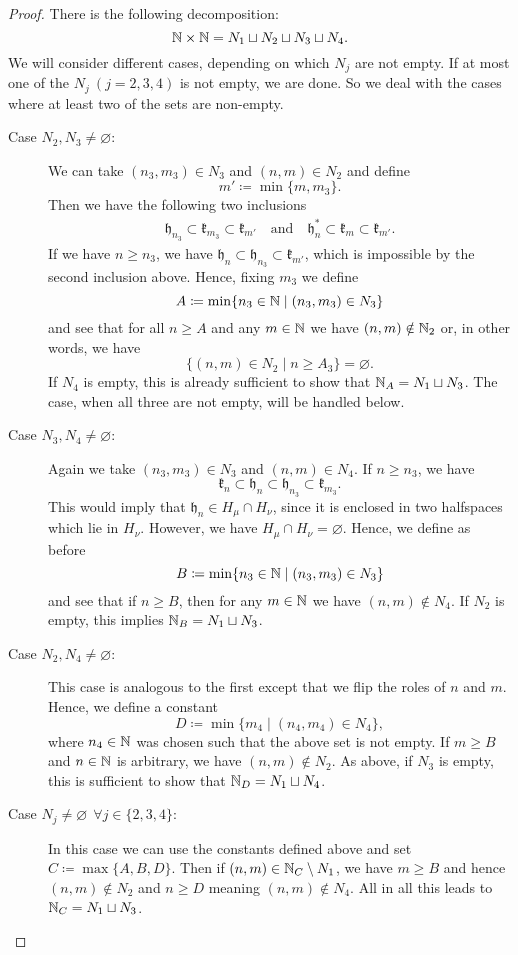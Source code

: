 \begin{proof}
  There is the following decomposition:
  \[
    \mathbb{N} \times \mathbb{N} = N_1 \sqcup N_2 \sqcup N_3 \sqcup N_4.
  \] 
  We will consider different cases, depending on which \(N_j\) are not empty. If at most one of the \(N_j\ (j = 2,3,4)\)  is not empty, we are done. So we deal with the cases where at least two of the sets are non-empty.
  \begin{description}
  \item[Case \(N_2, N_3 \neq \varnothing\):] We can take \((n_3, m_3) \in N_3\) and \((n,m) \in N_2\) and define
    \[
      m' \coloneqq \min\{m, m_3\}.
    \]
    Then we have the following two inclusions
    \begin{align*}
      \mathfrak{h}_{n_3} \subset \mathfrak{k}_{m_3} \subset \mathfrak{k}_{m'} \quad \text{and}\quad \mathfrak{h}_{n}^\ast \subset \mathfrak{k}_m \subset \mathfrak{k}_{m'}.
    \end{align*}
    If we have \(n \geq n_3\), we have \(\mathfrak{h}_n \subset \mathfrak{h}_{n_3} \subset \mathfrak{k}_{m'}\), which is impossible by the second inclusion above. Hence, fixing \(m_3\) we define
    \[
      A \coloneqq \min \{n_3 \in \mathbb{N} \mid (n_3, m_3) \in N_3\}
    \]
    and see that for all \(n \geq A\) and any \(m \in \mathbb{N}\) we have \((n,m) \notin \mathbb{N}_2\) or, in other words, we have
    \[
      \{(n,m) \in N_2 \mid n \geq A_3\} = \varnothing.
    \]
    If \(N_4\) is empty, this is already sufficient to show that \(\mathbb{N}_A = N_1 \sqcup N_3\). The case, when all three are not empty, will be handled below.
  \item[Case \(N_3,N_4 \neq \varnothing\):] Again we take \((n_3, m_3) \in N_3\) and \((n,m) \in N_4\). If \(n \geq n_3\), we have
    \[
      \mathfrak{k}_n \subset \mathfrak{h}_n \subset \mathfrak{h}_{n_3} \subset \mathfrak{k}_{m_3}.
    \]
    This would imply that \(\mathfrak{h}_n \in H_\mu \cap H_\nu\), since it is enclosed in two halfspaces which lie in \(H_\nu\). However, we have \(H_\mu \cap H_\nu = \varnothing\). Hence, we define as before
    \[
      B \coloneqq \min \{n_3 \in \mathbb{N} \mid (n_3, m_3) \in N_3\}
    \]
    and see that if \(n \geq B\), then for any \(m \in \mathbb{N}\) we have \((n,m) \notin N_4\). If \(N_2\) is empty, this implies \(\mathbb{N}_B = N_1 \sqcup N_3\).
  \item[Case \(N_2,N_4 \neq \varnothing\):] This case is analogous to the first except that we flip the roles of \(n\) and \(m\). Hence, we define a constant
    \[
      D \coloneqq \min \{m_4 \mid (n_4, m_4) \in N_4\},
    \]
    where \(n_4 \in \mathbb{N}\) was chosen such that the above set is not empty. If \(m \geq B\) and \(n \in \mathbb{N}\) is arbitrary, we have \((n, m) \notin N_2\). As above, if \(N_3 \) is empty, this is sufficient to show that \(\mathbb{N}_D = N_1 \sqcup N_4\).
  \item[Case \(N_j \neq \varnothing\ \ \forall j \in\{2,3,4\}\):] In this case we can use the constants defined above and set \(C \coloneqq \max \{A,B,D\}\). Then if \((n,m) \in \mathbb{N}_C \setminus N_1\), we have \(m \geq B\) and hence \((n,m) \notin N_2\) and \(n \geq D\) meaning \((n,m) \notin N_4\). All in all this leads to \(\mathbb{N}_C = N_1 \sqcup N_3\).
  \end{description}
\end{proof}

